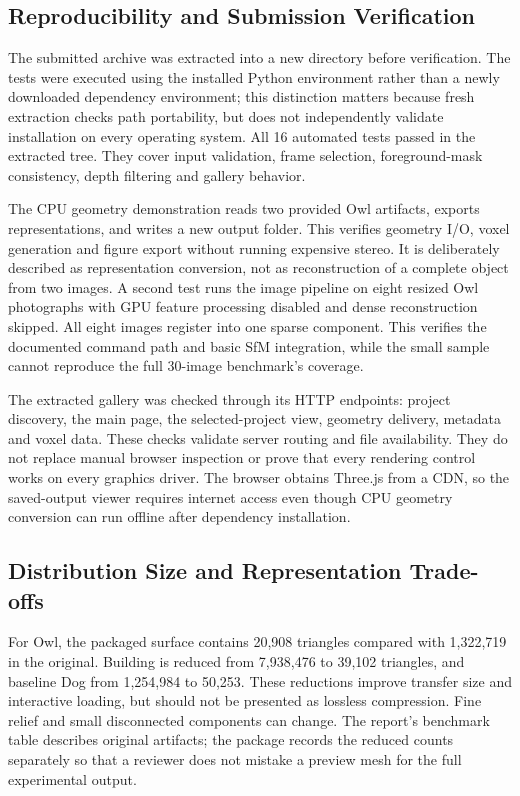 \documentclass[conference]{IEEEtran}
\begin{document}
\subsection{Reproducibility and Submission Verification}
The submitted archive was extracted into a new directory before verification. The tests were executed using the installed Python environment rather than a newly downloaded dependency environment; this distinction matters because fresh extraction checks path portability, but does not independently validate installation on every operating system. All 16 automated tests passed in the extracted tree. They cover input validation, frame selection, foreground-mask consistency, depth filtering and gallery behavior.

The CPU geometry demonstration reads two provided Owl artifacts, exports representations, and writes a new output folder. This verifies geometry I/O, voxel generation and figure export without running expensive stereo. It is deliberately described as representation conversion, not as reconstruction of a complete object from two images. A second test runs the image pipeline on eight resized Owl photographs with GPU feature processing disabled and dense reconstruction skipped. All eight images register into one sparse component. This verifies the documented command path and basic SfM integration, while the small sample cannot reproduce the full 30-image benchmark's coverage.

The extracted gallery was checked through its HTTP endpoints: project discovery, the main page, the selected-project view, geometry delivery, metadata and voxel data. These checks validate server routing and file availability. They do not replace manual browser inspection or prove that every rendering control works on every graphics driver. The browser obtains Three.js from a CDN, so the saved-output viewer requires internet access even though CPU geometry conversion can run offline after dependency installation.

\subsection{Distribution Size and Representation Trade-offs}
For Owl, the packaged surface contains 20,908 triangles compared with 1,322,719 in the original. Building is reduced from 7,938,476 to 39,102 triangles, and baseline Dog from 1,254,984 to 50,253. These reductions improve transfer size and interactive loading, but should not be presented as lossless compression. Fine relief and small disconnected components can change. The report's benchmark table describes original artifacts; the package records the reduced counts separately so that a reviewer does not mistake a preview mesh for the full experimental output.
\end{document}
